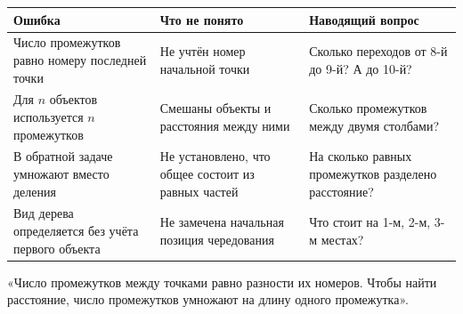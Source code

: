 \begin{center}
  \renewcommand{\arraystretch}{1.42}
  \begin{tabularx}{\textwidth}{
    >{\raggedright\arraybackslash}p{}
    >{\raggedright\arraybackslash}p{}
    >{\raggedright\arraybackslash}X}
    \toprule
    \rowcolor{TableHeader}
    Ошибка & Что не понято & Наводящий вопрос \\
    \midrule
    Число промежутков равно номеру последней точки
      & Не учтён номер начальной точки
      & Сколько переходов от 8-й до 9-й? А до 10-й? \\
    \addlinespace[0.2em]
    Для \(n\) объектов используется \(n\) промежутков
      & Смешаны объекты и расстояния между ними
      & Сколько промежутков между двумя столбами? \\
    \addlinespace[0.2em]
    В обратной задаче умножают вместо деления
      & Не установлено, что общее состоит из равных частей
      & На сколько равных промежутков разделено расстояние? \\
    \addlinespace[0.2em]
    Вид дерева определяется без учёта первого объекта
      & Не замечена начальная позиция чередования
      & Что стоит на 1-м, 2-м, 3-м местах? \\
    \bottomrule
  \end{tabularx}
\end{center}

\begin{teacherbox}
  «Число промежутков между точками равно разности их номеров. Чтобы найти
  расстояние, число промежутков умножают на длину одного промежутка».
\end{teacherbox}
